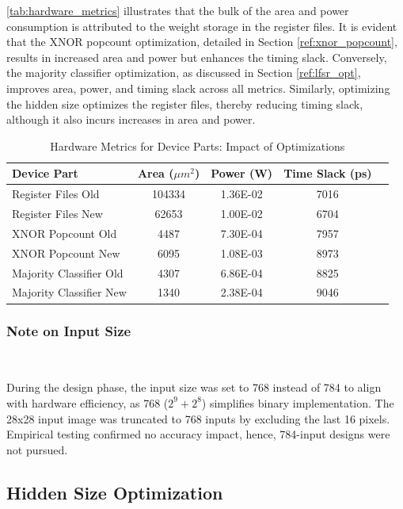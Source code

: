 \documentclass[conference]{IEEEtran}
\begin{document}
\autoref{tab:hardware_metrics} illustrates that the bulk of the area and power consumption is attributed to the weight storage in the register files. It is evident that the XNOR popcount optimization, detailed in Section \ref{ref:xnor_popcount}, results in increased area and power but enhances the timing slack. Conversely, the majority classifier optimization, as discussed in Section \ref{ref:lfsr_opt}, improves area, power, and timing slack across all metrics. Similarly, optimizing the hidden size optimizes the register files, thereby reducing timing slack, although it also incurs increases in area and power.

\begin{table}[h]
    \centering
    \caption{Hardware Metrics for Device Parts: Impact of Optimizations}
    \label{tab:hardware_metrics}
    \begin{tabular}{@{}lcccc@{}}
        \toprule
        \textbf{Device Part} & \textbf{Area (\(\mu m^2\))} & \textbf{Power (W)} & \textbf{Time Slack (ps)} \\
        \midrule
        Register Files Old & 104334 & 1.36E-02 & 7016 \\
        Register Files New & 62653 & 1.00E-02 & 6704 \\
        XNOR Popcount Old & 4487 & 7.30E-04 & 7957 \\
        XNOR Popcount New & 6095 & 1.08E-03 & 8973 \\
        Majority Classifier Old & 4307 & 6.86E-04 & 8825 \\
        Majority Classifier New & 1340 & 2.38E-04 & 9046 \\
        \bottomrule
    \end{tabular}
\end{table}

\subsubsection{Note on Input Size}
\hfill\\
\label{ref:why_768}

During the design phase, the input size was set to 768 instead of 784 to align with hardware efficiency, as 768 (\(2^9 + 2^8\)) simplifies binary implementation. The 28x28 input image was truncated to 768 inputs by excluding the last 16 pixels. Empirical testing confirmed no accuracy impact, hence, 784-input designs were not pursued.


\subsection{Hidden Size Optimization}
\end{document}
